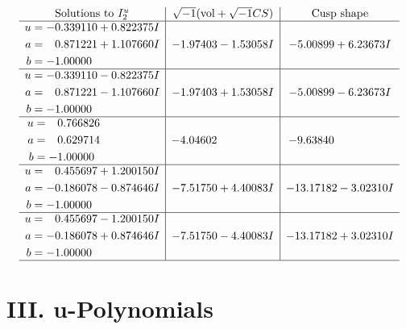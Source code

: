 \documentclass[1p]{elsarticle_modified}
\theoremstyle{definition}
\newcommand{\I}{\sqrt{-1}}
\begin{document}
$$\begin{array}{c|c|c}  
\text{Solutions to }I^u_{2}& \I (\text{vol} + \sqrt{-1}CS) & \text{Cusp shape}\\
 \hline 
\begin{aligned}
u &= -0.339110 + 0.822375 I \\
a &= \phantom{-}0.871221 + 1.107660 I \\
b &= -1.00000\phantom{ +0.000000I}\end{aligned}
 & -1.97403 - 1.53058 I & -5.00899 + 6.23673 I \\ \hline\begin{aligned}
u &= -0.339110 - 0.822375 I \\
a &= \phantom{-}0.871221 - 1.107660 I \\
b &= -1.00000\phantom{ +0.000000I}\end{aligned}
 & -1.97403 + 1.53058 I & -5.00899 - 6.23673 I \\ \hline\begin{aligned}
u &= \phantom{-}0.766826\phantom{ +0.000000I} \\
a &= \phantom{-}0.629714\phantom{ +0.000000I} \\
b &= -1.00000\phantom{ +0.000000I}\end{aligned}
 & -4.04602\phantom{ +0.000000I} & -9.63840\phantom{ +0.000000I} \\ \hline\begin{aligned}
u &= \phantom{-}0.455697 + 1.200150 I \\
a &= -0.186078 - 0.874646 I \\
b &= -1.00000\phantom{ +0.000000I}\end{aligned}
 & -7.51750 + 4.40083 I & -13.17182 - 3.02310 I \\ \hline\begin{aligned}
u &= \phantom{-}0.455697 - 1.200150 I \\
a &= -0.186078 + 0.874646 I \\
b &= -1.00000\phantom{ +0.000000I}\end{aligned}
 & -7.51750 - 4.40083 I & -13.17182 + 3.02310 I\\
 \hline 
 \end{array}$$\newpage
\newpage\renewcommand{\arraystretch}{1}
\centering \section*{ III. u-Polynomials}
\end{document}
